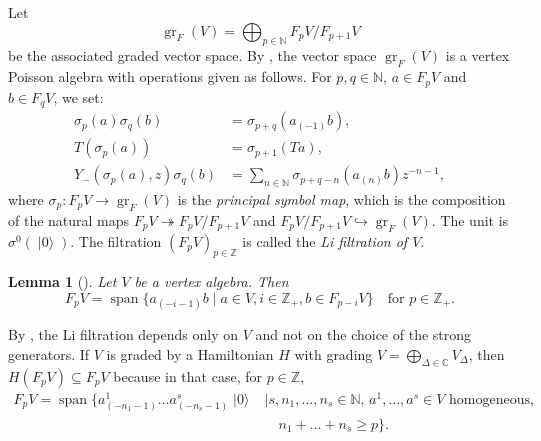 \documentclass[a4paper, 12pt, reqno]{amsart}
\newtheorem{lemma}[theorem]{Lemma}
\theoremstyle{remark}
\DeclareMathOperator{\gr}{gr}
\DeclareMathOperator{\vspan}{span}
\DeclareMathOperator{\vac}{|0\rangle}
\begin{document}
Let
\begin{equation*}
  \gr_F(V) = \bigoplus_{p \in \mathbb{N}}F_pV/F_{p + 1}V
\end{equation*}
be the associated graded vector space.
By \cite{li_abelianizing_2005}, the vector space $\gr_F(V)$ is a vertex Poisson algebra with operations given as follows.
For $p, q \in \mathbb{N}$, $a \in F_pV$ and $b \in F_qV$, we set:
\begin{align*}
  \sigma_p(a)\sigma_q(b) &= \sigma_{p + q}(a_{(-1)}b), \\
  T(\sigma_p(a)) &= \sigma_{p + 1}(Ta), \\
  Y_-(\sigma_p(a), z)\sigma_q(b) &= \sum_{n \in \mathbb{N}}\sigma_{p + q - n}(a_{(n)}b)z^{-n - 1},
\end{align*}
where $\sigma_p: F_pV \to \gr_F(V)$ is the \emph{principal symbol map}, which is the composition of the natural maps $F_pV \twoheadrightarrow F_pV/F_{p + 1}V$ and $F_pV/F_{p + 1}V \hookrightarrow \gr_F(V)$.
The unit is $\sigma^0(\vac)$.
The filtration $(F_pV)_{p \in \mathbb{Z}}$ is called the \emph{Li filtration of $V$}.

\begin{lemma}[{\cite[Lemma 2.9]{li_abelianizing_2005}}]
  \label{lmm:23}
  Let $V$ be a vertex algebra.
  Then
  \begin{equation*}
    F_pV = \vspan\{a_{(-i - 1)}b \mid a \in V, i \in \mathbb{Z}_+, b \in F_{p - i}V\} \quad \text{for $p \in \mathbb{Z}_+$}.
  \end{equation*}
\end{lemma}

By , the Li filtration depends only on $V$ and not on the choice of the strong generators.
If $V$ is graded by a Hamiltonian $H$ with grading $V = \bigoplus_{\Delta \in \mathbb{C}}V_{\Delta}$, then $H(F_pV) \subseteq F_pV$ because in that case, for $p \in \mathbb{Z}$,
\begin{equation*}
  \begin{split}
    F_pV = \vspan\{a^1_{(-n_1 - 1)}\dots a^s_{(-n_s - 1)}\vac &\mid \text{$s, n_1, \dots, n_s \in \mathbb{N}$, $a^1, \dots, a^s \in V$ homogeneous,} \\
                                                              &\quad n_1 + \dots + n_s \ge p\}.
  \end{split}
\end{equation*}
\end{document}
